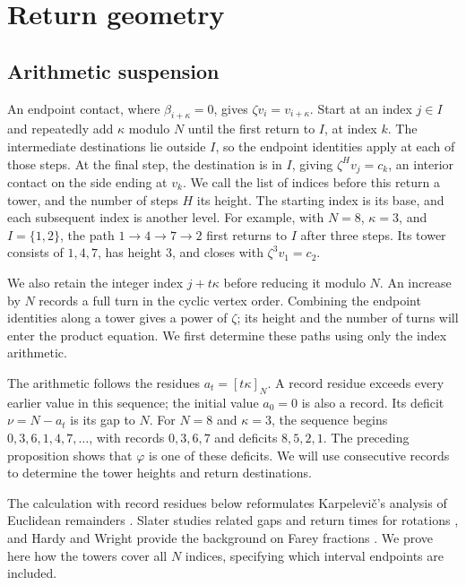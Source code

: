 \documentclass[11pt,a4paper]{article}
\theoremstyle{definition}
\theoremstyle{remark}
\numberwithin{equation}{section}
\begin{document}

\section{Return geometry}
\subsection{Arithmetic suspension}\label{sec:return-arithmetic}
An endpoint contact, where $\beta_{i+\kappa}=0$, gives $\zeta v_i=v_{i+\kappa}$. Start at an index $j\in I$ and repeatedly add $\kappa$ modulo $N$ until the first return to $I$, at index $k$. The intermediate destinations lie outside $I$, so the endpoint identities apply at each of those steps. At the final step, the destination is in $I$, giving $\zeta^H v_j=c_k$, an interior contact on the side ending at $v_k$. We call the list of indices before this return a tower, and the number of steps $H$ its height. The starting index is its base, and each subsequent index is another level. For example, with $N=8$, $\kappa=3$, and $I=\{1,2\}$, the path $1\to4\to7\to2$ first returns to $I$ after three steps. Its tower consists of $1,4,7$, has height $3$, and closes with $\zeta^3v_1=c_2$.

We also retain the integer index $j+t\kappa$ before reducing it modulo $N$. An increase by $N$ records a full turn in the cyclic vertex order. Combining the endpoint identities along a tower gives a power of $\zeta$; its height and the number of turns will enter the product equation. We first determine these paths using only the index arithmetic.

The arithmetic follows the residues $a_t=[t\kappa]_N$. A record residue exceeds every earlier value in this sequence; the initial value $a_0=0$ is also a record. Its deficit $\nu=N-a_t$ is its gap to $N$. For $N=8$ and $\kappa=3$, the sequence begins $0,3,6,1,4,7,\ldots$, with records $0,3,6,7$ and deficits $8,5,2,1$. The preceding proposition shows that $\varphi$ is one of these deficits. We will use consecutive records to determine the tower heights and return destinations.

The calculation with record residues below reformulates Karpelevi\v{c}'s analysis of Euclidean remainders \cite[\S3, Lemma~2 and Theorems~III--IV]{Karp}. Slater studies related gaps and return times for rotations \cite{Slater}, and Hardy and Wright provide the background on Farey fractions \cite[Chapter~III]{HardyWright}. We prove here how the towers cover all $N$ indices, specifying which interval endpoints are included.
\end{document}
